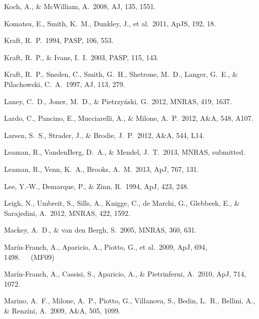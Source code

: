 \documentclass[12pt,preprint]{aastex}
\begin{document}
\begin{thebibliography}{}
Koch, A., \& McWilliam, A.~2008, AJ, 135, 1551.

Komatsu, E., Smith, K.~M., Dunkley, J., et al.~2011, ApJS, 192, 18.

Kraft, R.~P.~1994, PASP, 106, 553.

Kraft, R.~P., \& Ivans, I.~I.~2003, PASP, 115, 143.

Kraft, R.~P., Sneden, C., Smith, G.~H., Shetrone, M.~D., Langer, G.~E., \&
Pilachowski, C.~A.~1997, AJ, 113, 279.

Laney, C.~D., Joner, M.~D., \& Pietrzy\'nski, G.~2012, MNRAS, 419, 1637.

Lardo, C., Pancino, E., Mucciarelli, A., \& Milone, A.~P.~2012, A\&A, 548,
 A107.

Larsen, S.~S., Strader, J., \& Brodie, J.~P.~2012, A\&A, 544, L14.

Leaman, R., VandenBerg, D.~A., \& Mendel, J.~T.~2013, MNRAS, submitted.

Leaman, R., Venn, K.~A., Brooks, A.~M.~2013, ApJ, 767, 131.

Lee, Y.-W., Demarque, P., \& Zinn, R.~1994, ApJ, 423, 248.

Leigh, N., Umbreit, S., Sills, A., Knigge, C., de Marchi, G., Glebbeek, E.,
 \& Sarajedini, A.~2012, MNRAS, 422, 1592.


Mackey, A.~D., \& van den Bergh, S.~2005, MNRAS, 360, 631.

Mar\'in-Franch, A., Aparicio, A., Piotto, G., et al.~2009, ApJ, 694,
 1498.\ \ \ (MF09)

Mar\'in-Franch, A., Cassisi, S., Aparicio, A., \& Pietrinferni, A.~2010, ApJ,
 714, 1072.

Marino, A.~F., Milone, A.~P., Piotto, G., Villanova, S., Bedin, L.~R., Bellini,
 A., \& Renzini, A.~2009, A\&A, 505, 1099.


\end{thebibliography}
\end{document}
